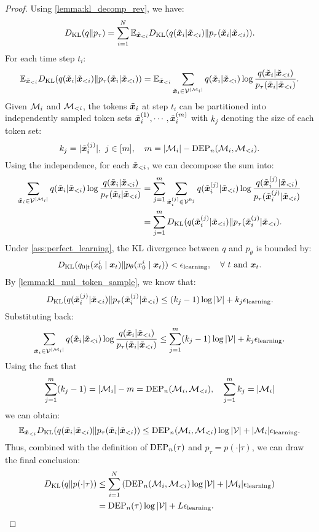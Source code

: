 \begin{proof}
    Using \cref{lemma:kl_decomp_rev}, we have:
    $$D_{\mathrm{KL}}(q\|p_\tau) = \sum_{i=1}^N \mathbb{E}_{\Tilde{{\bm{x}}}_{<i}}D_{\mathrm{KL}}(q(\Tilde{{\bm{x}}}_i | \Tilde{{\bm{x}}}_{<i})\|p_\tau(\Tilde{{\bm{x}}}_i | \Tilde{{\bm{x}}}_{<i})).$$
    For each time step $t_i$:
    $$\mathbb{E}_{\Tilde{{\bm{x}}}_{<i}}D_{\mathrm{KL}}(q(\Tilde{{\bm{x}}}_i | \Tilde{{\bm{x}}}_{<i})\|p_\tau(\Tilde{{\bm{x}}}_i | \Tilde{{\bm{x}}}_{<i}))=\mathbb{E}_{\Tilde{{\bm{x}}}_{<i}}\sum_{\Tilde{{\bm{x}}}_i\in{\mathcal{V}}^{|{\mathcal{M}}_i|}}q(\Tilde{{\bm{x}}}_i | \Tilde{{\bm{x}}}_{<i})\log\frac{q(\Tilde{{\bm{x}}}_i | \Tilde{{\bm{x}}}_{<i})}{p_\tau(\Tilde{{\bm{x}}}_i | \Tilde{{\bm{x}}}_{<i})}.$$
    Given ${\mathcal{M}}_i$ and ${\mathcal{M}}_{<i}$, the tokens $\Tilde{{\bm{x}}}_i$ at step $t_i$ can be partitioned into independently sampled token sets $\Tilde{{\bm{x}}}_i^{(1)},\cdots,\Tilde{{\bm{x}}}_i^{(m)}$ with $k_j$ denoting the size of each token set: 
    $$k_j=|\Tilde{{\bm{x}}}_i^{(j)}|,\ j\in[m],\quad m=|{\mathcal{M}}_i|-\operatorname{DEP}_n({\mathcal{M}}_i,{\mathcal{M}}_{<i}).$$
    Using the independence, for each $\Tilde{{\bm{x}}}_{<i}$, we can decompose the sum into:
    \begin{align*}
    \sum_{\Tilde{{\bm{x}}}_i\in{\mathcal{V}}^{|{\mathcal{M}}_i|}}q(\Tilde{{\bm{x}}}_i | \Tilde{{\bm{x}}}_{<i})\log\frac{q(\Tilde{{\bm{x}}}_i | \Tilde{{\bm{x}}}_{<i})}{p_\tau(\Tilde{{\bm{x}}}_i | \Tilde{{\bm{x}}}_{<i})}&=\sum_{j=1}^m\sum_{\Tilde{{\bm{x}}}_i^{(j)}\in{\mathcal{V}}^{k_j}}q(\Tilde{{\bm{x}}}_i^{(j)} | \Tilde{{\bm{x}}}_{<i})\log\frac{q(\Tilde{{\bm{x}}}_i^{(j)} | \Tilde{{\bm{x}}}_{<i})}{p_\tau(\Tilde{{\bm{x}}}_i^{(j)} | \Tilde{{\bm{x}}}_{<i})}\\
    &=\sum_{j=1}^mD_{\mathrm{KL}}(q(\Tilde{{\bm{x}}}_i^{(j)} | \Tilde{{\bm{x}}}_{<i})\|p_\tau(\Tilde{{\bm{x}}}_i^{(j)} | \Tilde{{\bm{x}}}_{<i}).
    \end{align*}
    Under \cref{ass:perfect_learning}, the KL divergence between $q$ and $p_\theta$ is bounded by:
    $$D_{\mathrm{KL}}(q_{0|t}(x_0^i \mid {\bm{x}}_t)\|p_\mathbf{\theta}(x_0^i \mid {\bm{x}}_t)) < \epsilon_\text{learning}, \quad \forall\ t \text{ and } {\bm{x}}_t.$$
    By \cref{lemma:kl_mul_token_sample}, we know that:
    $$D_{\mathrm{KL}}(q(\Tilde{{\bm{x}}}_i^{(j)} | \Tilde{{\bm{x}}}_{<i})\|p_\tau(\Tilde{{\bm{x}}}_i^{(j)} | \Tilde{{\bm{x}}}_{<i})\leq (k_j-1)\log|{\mathcal{V}}|+k_j{\epsilon}_\mathrm{learning}.$$
    Substituting back:
    $$\sum_{\Tilde{{\bm{x}}}_i\in{\mathcal{V}}^{|{\mathcal{M}}_i|}}q(\Tilde{{\bm{x}}}_i | \Tilde{{\bm{x}}}_{<i})\log\frac{q(\Tilde{{\bm{x}}}_i | \Tilde{{\bm{x}}}_{<i})}{p_\tau(\Tilde{{\bm{x}}}_i | \Tilde{{\bm{x}}}_{<i})}\leq\sum_{j=1}^m(k_j-1)\log|{\mathcal{V}}|+k_j{\epsilon}_\mathrm{learning}.$$
    Using the fact that
    $$\sum_{j=1}^m(k_j-1)=|{\mathcal{M}}_i|-m=\operatorname{DEP}_n({\mathcal{M}}_i,{\mathcal{M}}_{<i}),\quad \sum_{j=1}^mk_j=|{\mathcal{M}}_i|$$
    we can obtain:
    $$\mathbb{E}_{\Tilde{{\bm{x}}}_{<i}}D_{\mathrm{KL}}(q(\Tilde{{\bm{x}}}_i | \Tilde{{\bm{x}}}_{<i})\|p_\tau(\Tilde{{\bm{x}}}_i | \Tilde{{\bm{x}}}_{<i}))\leq \operatorname{DEP}_n({\mathcal{M}}_i,{\mathcal{M}}_{<i})\log|{\mathcal{V}}|+|{\mathcal{M}}_i|{\epsilon}_\mathrm{learning}.$$
    Thus, combined with the definition of $\operatorname{DEP}_n(\tau)$ and $p_\tau=p(\cdot|\tau)$, we can draw the final conclusion:
    \begin{align*}
        D_{\mathrm{KL}}(q\|p(\cdot|\tau)) &\leq \sum_{i=1}^N\left(\operatorname{DEP}_n({\mathcal{M}}_i,{\mathcal{M}}_{<i})\log|{\mathcal{V}}|+|{\mathcal{M}}_i|{\epsilon}_\mathrm{learning}\right)\\
        &=\operatorname{DEP}_n(\tau) \log |{\mathcal{V}}|+L{\epsilon}_\mathrm{learning}.
    \end{align*}
\end{proof}

